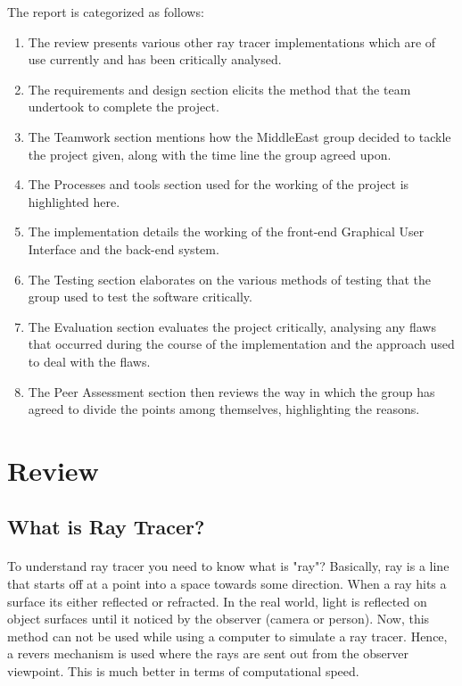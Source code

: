 \documentclass{article}
\begin{document}
The report is categorized as follows:
\begin{enumerate}
     

\item The review presents various other ray tracer implementations which are of use currently and has been critically analysed.
\item The requirements and design section elicits the method that the team undertook to complete the project.
\item	The Teamwork section mentions how the MiddleEast group decided to tackle the project given, along with the time line the group agreed upon. 
\item	The Processes and tools section used for the working of the project is highlighted here.
\item	The implementation details the working of the front-end Graphical User Interface and the back-end system.
\item	The Testing section elaborates on the various methods of testing that the group used to test the software critically.
\item	The Evaluation section evaluates the project critically, analysing any flaws that occurred during the course of the implementation and the approach used to deal with the flaws.
\item	The Peer Assessment section then reviews the way in which the group has agreed to divide the points among themselves, highlighting the reasons.
\end{enumerate}

\section{Review}
\subsection{What is Ray Tracer?}

\paragraph{}
To understand ray tracer you need to know what is "ray"? Basically, ray is a line that starts off at a point into a space towards some direction. When a ray hits a surface its either reflected or refracted.
In the real world, light is reflected on object surfaces until it noticed by the observer (camera or person). \newline Now, this method can not be used while using a computer to simulate a ray tracer. Hence, a revers mechanism is used where the rays are sent out from the observer viewpoint. This is much better in terms of computational speed. 
\end{document}
